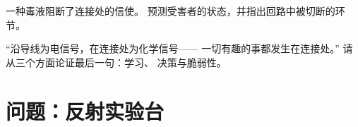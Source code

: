 \begin{exercise}[$\star\star$]\label{exo:g8:nervous-communication:11}
一种毒液阻断了连接处的信使。
预测受害者的状态，并指出回路中被切断的环节。
\end{exercise}

\begin{exercise}[$\star\star\star$]\label{exo:g8:nervous-communication:12}
“沿导线为电信号，在连接处为化学信号——
一切有趣的事都发生在连接处。”
请从三个方面论证最后一句：学习、
决策与脆弱性。
\end{exercise}

\section{问题：反射实验台}

